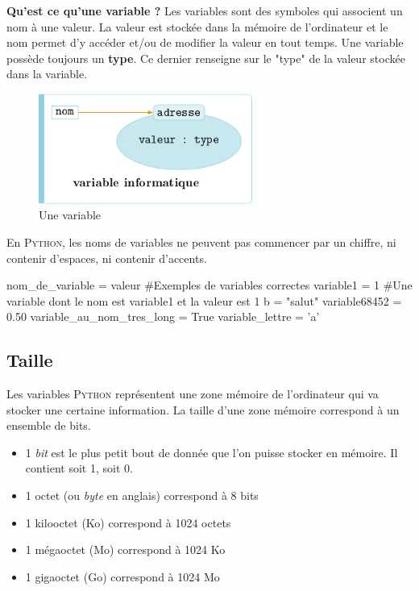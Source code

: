 \label{variables}
\textbf{Qu'est ce qu'une variable ?} Les variables sont des symboles qui associent un nom à une valeur. La valeur est stockée dans la mémoire de l'ordinateur et le nom permet d'y accéder et/ou de modifier la valeur en tout temps. Une variable possède toujours un \textbf{type}. Ce dernier renseigne sur le "type" de la valeur stockée dans la variable. 

\begin{figure}[h!]
    \centering
    \includegraphics[width=7cm]{img/variable.png}
    \caption{Une variable}
    \label{variable}
\end{figure}

En \textsc{Python}, les noms de variables ne peuvent pas commencer par un chiffre, ni contenir d'espaces, ni contenir d'accents.

\begin{python}[caption = déclaration de variables]
nom_de_variable = valeur
#Exemples de variables correctes
variable1 = 1 #Une variable dont le nom est variable1 et la valeur est 1
b = "salut"
variable68452 = 0.50
variable_au_nom_tres_long = True
variable_lettre = 'a'
\end{python}


\subsection{Taille}

Les variables \textsc{Python} représentent une zone mémoire de l'ordinateur qui va stocker une certaine information. La taille d'une zone mémoire correspond à un ensemble de bits.

\begin{itemize}
    \item 1 \textit{bit} est le plus petit bout de donnée que l'on
    puisse stocker en mémoire. Il contient soit 1, soit 0.
    \item 1 octet (ou \textit{byte} en anglais) correspond à 8 bits
    \item 1 kilooctet (Ko) correspond à 1024 octets 
    \item 1 mégaoctet (Mo) correspond à 1024 Ko 
    \item 1 gigaoctet (Go) correspond à 1024 Mo 
\end{itemize}


